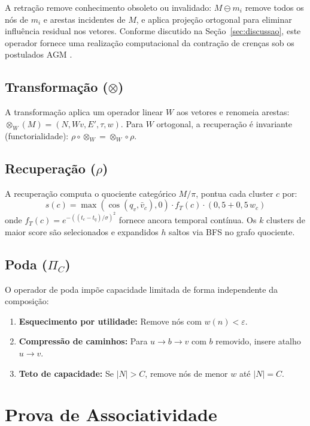 \documentclass[11pt,a4paper]{article}
\theoremstyle{definition}
\begin{document}
A retra\c{c}\~ao remove conhecimento obsoleto ou invalidado: $M \ominus m_i$ remove todos os n\'os de $m_i$ e arestas incidentes de $M$, e aplica proje\c{c}\~ao ortogonal para eliminar influ\^encia residual nos vetores. Conforme discutido na Se\c{c}\~ao~\ref{sec:discussao}, este operador fornece uma realiza\c{c}\~ao computacional da contra\c{c}\~ao de cren\c{c}as sob os postulados AGM \cite{alchourron1985logic}.

\subsection{Transforma\c{c}\~ao ($\otimes$)}

A transforma\c{c}\~ao aplica um operador linear $W$ aos vetores e renomeia arestas: $\otimes_W(M) = (N, Wv, E', \tau, w)$. Para $W$ ortogonal, a recupera\c{c}\~ao \'e invariante (functorialidade): $\rho \circ \otimes_W = \otimes_W \circ \rho$.

\subsection{Recupera\c{c}\~ao ($\rho$)}

A recupera\c{c}\~ao computa o quociente categ\'orico $M/\pi$, pontua cada cluster $c$ por:
\[
s(c) = \max(\cos(q_v, \bar{v}_c), 0) \cdot f_T(c) \cdot (0{,}5 + 0{,}5\, w_c)
\]
onde $f_T(c) = e^{-((t_c - t_q)/\sigma)^2}$ fornece ancora temporal cont\'inua. Os $k$ clusters de maior score s\~ao selecionados e expandidos $h$ saltos via BFS no grafo quociente.

\subsection{Poda ($\Pi_C$)}

O operador de poda imp\~oe capacidade limitada de forma independente da composi\c{c}\~ao:
\begin{enumerate}
    \item \textbf{Esquecimento por utilidade:} Remove n\'os com $w(n) < \varepsilon$.
    \item \textbf{Compress\~ao de caminhos:} Para $u \to b \to v$ com $b$ removido, insere atalho $u \to v$.
    \item \textbf{Teto de capacidade:} Se $|N| > C$, remove n\'os de menor $w$ at\'e $|N| = C$.
\end{enumerate}

\section{Prova de Associatividade}\label{sec:provas}
\end{document}
